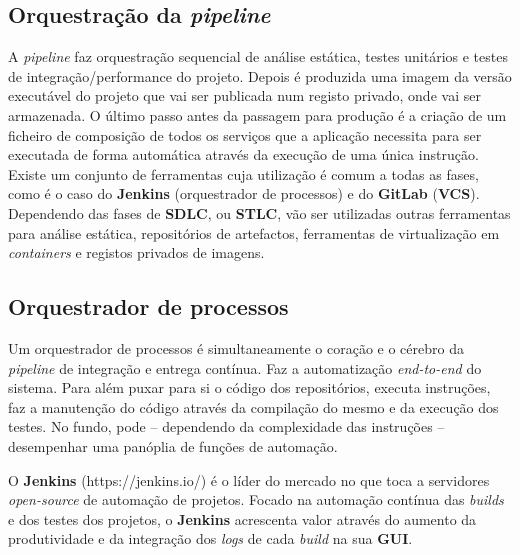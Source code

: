 \subsection{Orquestração da \textit{pipeline}}

\hspace{1cm}A \textit{pipeline} faz orquestração sequencial de análise estática, testes unitários e testes de integração/performance do projeto. Depois é produzida uma imagem da versão executável do projeto que vai ser publicada num registo privado, onde vai ser armazenada. O último passo antes da passagem para produção é a criação de um ficheiro de composição de todos os serviços que a aplicação necessita para ser executada de forma automática através da execução de uma única instrução. Existe um conjunto de ferramentas cuja utilização é comum a todas as fases, como é o caso do \textbf{Jenkins} (orquestrador de processos) e do \textbf{GitLab} (\textbf{VCS}). Dependendo das fases de \textbf{SDLC}, ou \textbf{STLC}, vão ser utilizadas outras ferramentas para análise estática, repositórios de artefactos, ferramentas de virtualização em \textit{containers} e registos privados de imagens.

\subsection{Orquestrador de processos}
\hspace{1cm}Um orquestrador de processos é simultaneamente o coração e o cérebro da \textit{pipeline} de integração e entrega contínua. Faz a automatização \textit{end-to-end} do sistema. Para além puxar para si o código dos repositórios, executa instruções, faz a manutenção do código através da compilação do mesmo e da execução dos testes. No fundo, pode -- dependendo da complexidade das instruções -- desempenhar uma panóplia de funções de automação.

\hspace{1cm}O \textbf{Jenkins} (https://jenkins.io/) é o líder do mercado no que toca a servidores \textit{open-source} de automação de projetos. Focado na automação contínua das \textit{builds} e dos testes dos projetos, o \textbf{Jenkins} acrescenta valor através do aumento da produtividade e da integração dos \textit{logs} de cada \textit{build} na sua \textbf{GUI}. 

